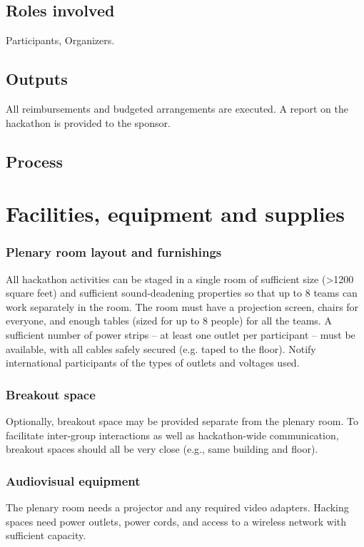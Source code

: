 \documentclass[letterpaper,11pt]{texMemo}
\begin{document}
\subsection{Roles involved}
Participants, Organizers. 
\subsection{Outputs}
All reimbursements and budgeted arrangements are executed. A report on the hackathon is provided to the sponsor.  
\subsection{Process}

\newpage
\section{Facilities, equipment and supplies}
\subsubsection*{Plenary room layout and furnishings} 
All hackathon activities can be staged in a single room of sufficient size (>1200 square feet) and sufficient sound-deadening properties so that up to 8 teams can work separately in the room. The room must have a projection screen, chairs for everyone, and enough tables (sized for up to 8 people) for all the teams. A sufficient number of power strips – at least one outlet per participant – must be available, with all cables safely secured (e.g. taped to the floor). Notify international participants of the types of outlets and voltages used.

\subsubsection*{Breakout space} 
Optionally, breakout space may be provided separate from the plenary room.  To facilitate inter-group interactions as well as hackathon-wide communication, breakout spaces should all be very close (e.g., same building and floor).
\subsubsection*{Audiovisual equipment} 
The plenary room needs a projector and any required video adapters. Hacking spaces need power outlets, power cords, and access to a wireless network with sufficient capacity.  
\end{document}
